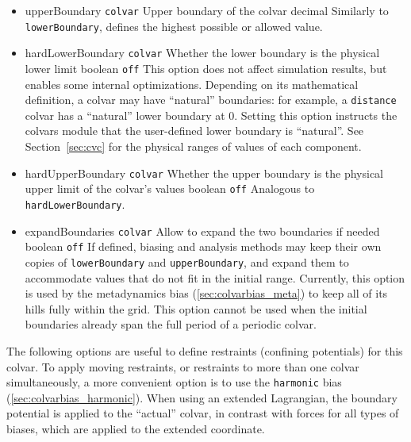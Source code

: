 \begin{itemize}
\item %
  \key
    {upperBoundary}{%
    \texttt{colvar}}{%
    Upper boundary of the colvar}{%
    decimal}{%
    Similarly to \texttt{lowerBoundary}, defines the highest possible or allowed value.}

\item %
  \keydef
    {hardLowerBoundary}{%
    \texttt{colvar}}{%
    Whether the lower boundary is the physical lower limit}{%
    boolean}{%
    \texttt{off}}{%
    This option does not affect simulation results, but enables some internal optimizations.
    Depending on its mathematical definition, a colvar may have ``natural'' boundaries: for example, a \texttt{distance} colvar has a ``natural'' lower boundary at 0.  Setting this option instructs the colvars module that the user-defined lower boundary is ``natural''.
See Section~\ref{sec:cvc} for the physical ranges of values of each component.}

\item %
  \keydef
    {hardUpperBoundary}{%
    \texttt{colvar}}{%
    Whether the upper boundary is the physical upper limit of the colvar's values}{%
    boolean}{%
    \texttt{off}}{%
    Analogous to \texttt{hardLowerBoundary}.}

\item %
  \keydef
    {expandBoundaries}{%
    \texttt{colvar}}{%
    Allow to expand the two boundaries if needed}{%
    boolean}{%
    \texttt{off}}{%
    If defined, biasing and analysis methods may keep their own copies
    of \texttt{lowerBoundary} and \texttt{upperBoundary}, and expand
    them to accommodate values that do not fit in the initial range.
    Currently, this option is used by the metadynamics bias
    (\ref{sec:colvarbias_meta}) to keep all of its hills fully within
    the grid.  This option cannot be used when
      the initial boundaries already span the full period of a periodic
      colvar.}
\end{itemize}



The following options are useful to define restraints (confining potentials) for this colvar.
To apply moving restraints, or restraints to more than one colvar simultaneously, a more convenient option is to use the \texttt{harmonic} bias (\ref{sec:colvarbias_harmonic}).
When using an extended Lagrangian, the boundary potential is applied to the ``actual'' colvar, in contrast with forces for all types of biases, which are applied to the extended coordinate.

